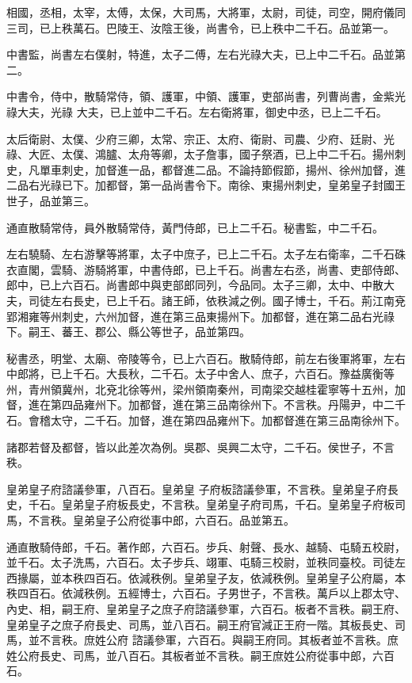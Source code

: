 \begin{pinyinscope}
 相國，丞相，太宰，太傅，太保，大司馬，大將軍，太尉，司徒，司空，開府儀同三司，已上秩萬石。巴陵王、汝陰王後，尚書令，已上秩中二千石。品並第一。



 中書監，尚書左右僕射，特進，太子二傅，左右光祿大夫，已上中二千石。品並第二。



 中書令，侍中，散騎常侍，領、護軍，中領、護軍，吏部尚書，列曹尚書，金紫光祿大夫，光祿
 大夫，已上並中二千石。左右衛將軍，御史中丞，已上二千石。



 太后衛尉、太僕、少府三卿，太常、宗正、太府、衛尉、司農、少府、廷尉、光祿、大匠、太僕、鴻臚、太舟等卿，太子詹事，國子祭酒，已上中二千石。揚州刺史，凡單車刺史，加督進一品，都督進二品。不論持節假節，揚州、徐州加督，進二品右光祿已下。加都督，第一品尚書令下。南徐、東揚州刺史，皇弟皇子封國王世子，品並第三。



 通直散騎常侍，員外散騎常侍，黃門侍郎，已上二千石。秘書監，中二千石。



 左右驍騎、左右游擊等將軍，太子中庶子，已上二千石。太子左右衛率，二千石硃衣直閣，雲騎、游騎將軍，中書侍郎，已上千石。尚書左右丞，尚書、吏部侍郎、郎中，已上六百石。尚書郎中與吏部郎同列，今品同。太子三卿，太中、中散大
 夫，司徒左右長史，已上千石。諸王師，依秩減之例。國子博士，千石。荊江南兗郢湘雍等州刺史，六州加督，進在第三品東揚州下。加都督，進在第二品右光祿下。嗣王、蕃王、郡公、縣公等世子，品並第四。



 秘書丞，明堂、太廟、帝陵等令，已上六百石。散騎侍郎，前左右後軍將軍，左右中郎將，已上千石。大長秋，二千石。太子中舍人、庶子，六百石。豫益廣衡等州，青州領冀州，北兗北徐等州，梁州領南秦州，司南梁交越桂霍寧等十五州，加督，進在第四品雍州下。加都督，進在第三品南徐州下。不言秩。丹陽尹，中二千石。會稽太守，二千石。加督，進在第四品雍州下。加都督進在第三品南徐州下。



 諸郡若督及都督，皆以此差次為例。吳郡、吳興二太守，二千石。侯世子，不言秩。



 皇弟皇子府諮議參軍，八百石。皇弟皇
 子府板諮議參軍，不言秩。皇弟皇子府長史，千石。皇弟皇子府板長史，不言秩。皇弟皇子府司馬，千石。皇弟皇子府板司馬，不言秩。皇弟皇子公府從事中郎，六百石。品並第五。



 通直散騎侍郎，千石。著作郎，六百石。步兵、射聲、長水、越騎、屯騎五校尉，並千石。太子洗馬，六百石。太子步兵、翊軍、屯騎三校尉，並秩同臺校。司徒左西掾屬，並本秩四百石。依減秩例。皇弟皇子友，依減秩例。皇弟皇子公府屬，本秩四百石。依減秩例。五經博士，六百石。子男世子，不言秩。萬戶以上郡太守、內史、相，嗣王府、皇弟皇子之庶子府諮議參軍，六百石。板者不言秩。嗣王府、皇弟皇子之庶子府長史、司馬，並八百石。嗣王府官減正王府一階。其板長史、司馬，並不言秩。庶姓公府
 諮議參軍，六百石。與嗣王府同。其板者並不言秩。庶姓公府長史、司馬，並八百石。其板者並不言秩。嗣王庶姓公府從事中郎，六百石。




\end{pinyinscope}
